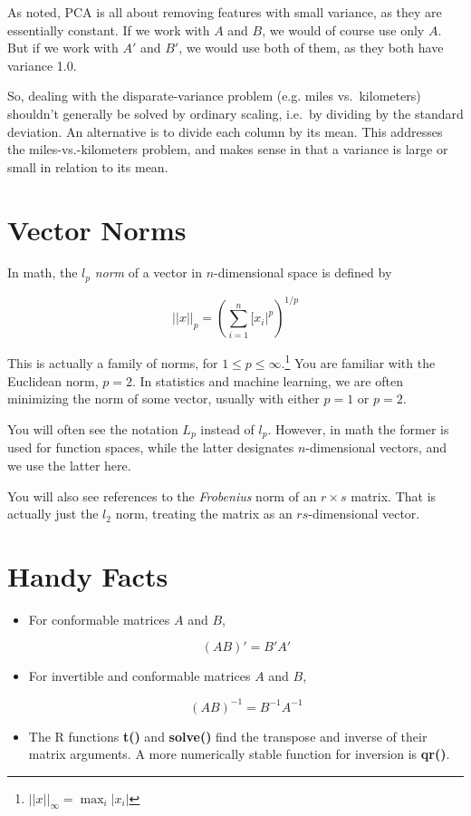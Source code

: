 As noted, PCA is all about removing features with small variance, as
they are essentially constant. If we work with $A$ and $B$, we would of
course use only $A$. But if we work with $A'$ and $B'$, we would use
both of them, as they both have variance 1.0.

So, dealing with the disparate-variance problem (e.g. miles vs.\
kilometers) shouldn't generally be solved by ordinary scaling, i.e.\ by
dividing by the standard deviation.  An alternative is to divide each
column by its mean.  This addresses the miles-vs.-kilometers problem,
and makes sense in that a variance is large or small in relation to its
mean.

\section{Vector Norms}
\label{vecnorms}

In math, the $l_p$ \textit{norm} of a vector in $n$-dimensional space is
defined by

\begin{equation}
||x||_p = \left ( \sum_{i=1}^n [x_i|^p \right )^{1/p}
\end{equation}

This is actually a family of norms, for $1 \leq p \leq
\infty$.\footnote{$||x||_{\infty} = \max_i |x_i|$} You are familiar with
the Euclidean norm, $p = 2$.  In statistics and machine learning, we are
often minimizing the norm of some vector, usually with either $p = 1$ or
$p = 2$.

You will often see the notation $L_p$ instead of $l_p$.  However, in
math the former is used for function spaces, while the latter designates
$n$-dimensional vectors, and we use the latter here.

You will also see references to the {\it Frobenius} norm of an $r \times
s$ matrix.  That is actually just the $l_2$ norm, treating the matrix
as an $rs$-dimensional vector.

\section{Handy Facts}

\begin{itemize}

\item For conformable matrices $A$ and $B$, 

\begin{equation}
(AB)' = B'A'
\end{equation}

\item For invertible and conformable matrices $A$ and $B$, 

\begin{equation}
(AB)^{-1} = B^{-1} A^{-1}
\end{equation}

\item The R functions \textbf{t()} and \textbf{solve()} find the
transpose and inverse of their matrix arguments.  A more numerically
stable function for inversion is \textbf{qr()}.
\end{itemize} 
